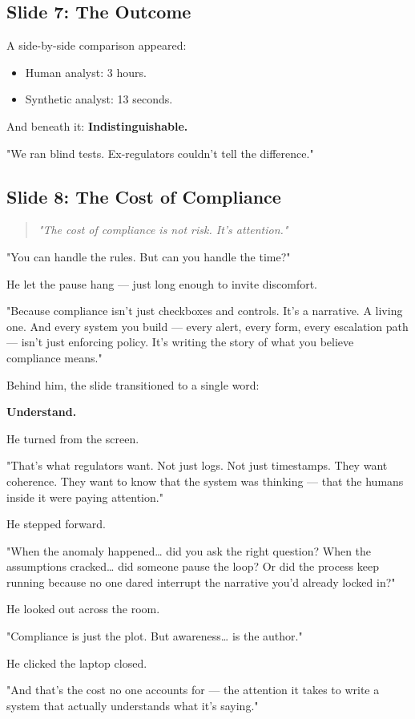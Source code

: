 \subsection{Slide 7: The Outcome}

A side-by-side comparison appeared:
\begin{itemize}
\item Human analyst: 3 hours.
\item Synthetic analyst: 13 seconds.
\end{itemize}

And beneath it:
\textbf{Indistinguishable.}

"We ran blind tests. Ex-regulators couldn't tell the difference."

\subsection{Slide 8: The Cost of Compliance}

\begin{quote}
\textit{"The cost of compliance is not risk. It's attention."}
\end{quote}

"You can handle the rules. But can you handle the time?"

He let the pause hang — just long enough to invite discomfort.

"Because compliance isn’t just checkboxes and controls.
It’s a narrative.
A living one.
And every system you build — every alert, every form, every escalation path —
isn’t just enforcing policy. It’s writing the story of what you believe compliance means."

Behind him, the slide transitioned to a single word:

\begin{center}
\Huge
\textbf{Understand.}
\end{center}

He turned from the screen.

"That’s what regulators want.
Not just logs. Not just timestamps.
They want coherence. They want to know that the system was thinking —
that the humans inside it were paying attention."

He stepped forward.

"When the anomaly happened… did you ask the right question?
When the assumptions cracked… did someone pause the loop?
Or did the process keep running because no one dared interrupt the narrative you’d already locked in?"

He looked out across the room.

"Compliance is just the plot.
But awareness… is the author."

He clicked the laptop closed.

"And that’s the cost no one accounts for —
the attention it takes to write a system that actually understands what it’s saying."

